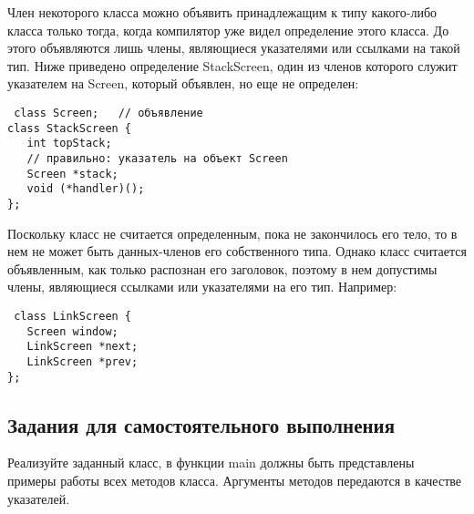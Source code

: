 \documentclass[a4paper,report,14pt]{ncc}
\begin{document}
Член некоторого класса можно объявить принадлежащим к типу какого-либо класса только тогда, когда компилятор уже видел определение этого класса. До этого объявляются лишь члены, являющиеся указателями или ссылками на такой тип. Ниже приведено определение StackScreen, один из членов которого служит указателем на Screen, который объявлен, но еще не определен:

\begin{verbatim}
 class Screen;   // объявление
class StackScreen {
   int topStack;
   // правильно: указатель на объект Screen
   Screen *stack;
   void (*handler)();
};
\end{verbatim}

Поскольку класс не считается определенным, пока не закончилось его тело, то в нем не может быть данных-членов его собственного типа. Однако класс считается объявленным, как только распознан его заголовок, поэтому в нем допустимы члены, являющиеся ссылками или указателями на его тип. Например:

\begin{verbatim}
 class LinkScreen {
   Screen window;
   LinkScreen *next;
   LinkScreen *prev;
};

\end{verbatim}


\subsection{Задания для самостоятельного выполнения}

Реализуйте заданный класс, в функции main должны быть представлены примеры работы всех методов класса. Аргументы методов передаются в качестве указателей.
\end{document}
